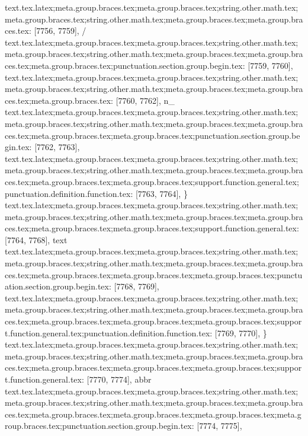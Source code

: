 {{{{{{{{{{{{{{{{{{{{{{{{{{{{{{{{{{{{{{{{{{{{{{{{{{{{{{{{{{{{{{{{{{{{{{{{{{{{{{{{{{{{{{{{{{{{{{{{{{{{{{{{{{{{{{{{{{{{{{{{{{{{{{{{{{{{{{{{{{{{{{{{{{{{{{{{{{{{{{{{{{{{{{{{{{{{{{{{{{{{{{{{{{{{{{{{{{{{{{{{{{{{{{{{{{{{{{{{{{{{{{{{{{{text.tex.latex;meta.group.braces.tex;meta.group.braces.tex;string.other.math.tex;meta.group.braces.tex;string.other.math.tex;meta.group.braces.tex;meta.group.braces.tex: [7756, 7759], { / }
text.tex.latex;meta.group.braces.tex;meta.group.braces.tex;string.other.math.tex;meta.group.braces.tex;string.other.math.tex;meta.group.braces.tex;meta.group.braces.tex;meta.group.braces.tex;punctuation.section.group.begin.tex: [7759, 7760], {{}
text.tex.latex;meta.group.braces.tex;meta.group.braces.tex;string.other.math.tex;meta.group.braces.tex;string.other.math.tex;meta.group.braces.tex;meta.group.braces.tex;meta.group.braces.tex: [7760, 7762], {n_}
text.tex.latex;meta.group.braces.tex;meta.group.braces.tex;string.other.math.tex;meta.group.braces.tex;string.other.math.tex;meta.group.braces.tex;meta.group.braces.tex;meta.group.braces.tex;meta.group.braces.tex;punctuation.section.group.begin.tex: [7762, 7763], {{}
text.tex.latex;meta.group.braces.tex;meta.group.braces.tex;string.other.math.tex;meta.group.braces.tex;string.other.math.tex;meta.group.braces.tex;meta.group.braces.tex;meta.group.braces.tex;meta.group.braces.tex;support.function.general.tex;punctuation.definition.function.tex: [7763, 7764], {\}
text.tex.latex;meta.group.braces.tex;meta.group.braces.tex;string.other.math.tex;meta.group.braces.tex;string.other.math.tex;meta.group.braces.tex;meta.group.braces.tex;meta.group.braces.tex;meta.group.braces.tex;support.function.general.tex: [7764, 7768], {text}
text.tex.latex;meta.group.braces.tex;meta.group.braces.tex;string.other.math.tex;meta.group.braces.tex;string.other.math.tex;meta.group.braces.tex;meta.group.braces.tex;meta.group.braces.tex;meta.group.braces.tex;meta.group.braces.tex;punctuation.section.group.begin.tex: [7768, 7769], {{}
text.tex.latex;meta.group.braces.tex;meta.group.braces.tex;string.other.math.tex;meta.group.braces.tex;string.other.math.tex;meta.group.braces.tex;meta.group.braces.tex;meta.group.braces.tex;meta.group.braces.tex;meta.group.braces.tex;support.function.general.tex;punctuation.definition.function.tex: [7769, 7770], {\}
text.tex.latex;meta.group.braces.tex;meta.group.braces.tex;string.other.math.tex;meta.group.braces.tex;string.other.math.tex;meta.group.braces.tex;meta.group.braces.tex;meta.group.braces.tex;meta.group.braces.tex;meta.group.braces.tex;support.function.general.tex: [7770, 7774], {abbr}
text.tex.latex;meta.group.braces.tex;meta.group.braces.tex;string.other.math.tex;meta.group.braces.tex;string.other.math.tex;meta.group.braces.tex;meta.group.braces.tex;meta.group.braces.tex;meta.group.braces.tex;meta.group.braces.tex;meta.group.braces.tex;punctuation.section.group.begin.tex: [7774, 7775], {{}
}}}}}}}}}}}}}}}}}}}}}}}}}}}}}}}}}}}}}}}}}}}}}}}}}}}}}}}}}}}}}}}}}}}}}}}}}}}}}}}}}}}}}}}}}}}}}}}}}}}}}}}}}}}}}}}}}}}}}}}}}}}}}}}}}}}}}}}}}}}}}}}}}}}}}}}}}}}}}}}}}}}}}}}}}}}}}}}}}}}}}}}}}}}}}}}}}}}}}}}}}}}}}}}}}}}}}}}}}}}}}}}}}}}}}}}}}
